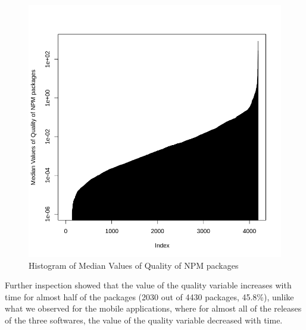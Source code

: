 \documentclass[smallcondensed]{svjour3}     %
\begin{document}
\begin{figure}[!t]
\centering
\includegraphics[width=0.75\linewidth]{qNPM}
\vspace{-10pt}
\caption{Histogram of Median Values of Quality of NPM packages}
\label{fig:qNPM}
\vspace{-10pt}
\end{figure}

Further inspection showed that the value of the quality variable increases with time for almost half of the packages (2030 out of 4430 packages, 45.8\%), unlike what we observed for the mobile applications, where for almost all of the releases of the three softwares, the value of the quality variable decreased with time.
\end{document}
